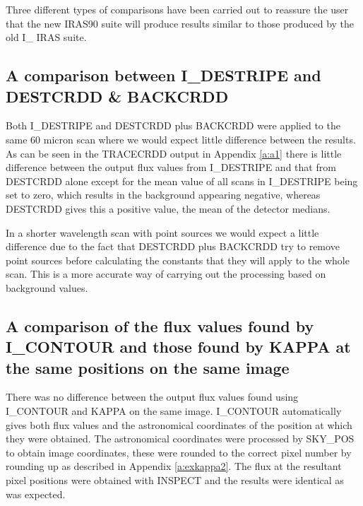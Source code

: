 Three different types of comparisons have been carried out to reassure the user
that the new IRAS90 suite will produce results similar to those produced by
the old  I\_ IRAS suite. 

\subsection{A comparison between I\_DESTRIPE and DESTCRDD \& BACKCRDD}

Both I\_DESTRIPE and DESTCRDD plus BACKCRDD were applied to the same 60 micron
scan where we would expect little difference between the results. As can be 
seen in the TRACECRDD output in Appendix \ref{a:a1} there is little difference
between the output flux values from I\_DESTRIPE and that from DESTCRDD alone
except for the mean value of all scans in I\_DESTRIPE being set to zero, which
results in the background appearing negative, whereas DESTCRDD gives this a 
positive value, the mean of the detector medians. 

In a shorter wavelength scan with point sources we would expect a little
difference due to the fact that DESTCRDD plus BACKCRDD try to remove point
sources before calculating the  constants that they will apply to the whole 
scan. This is a  more accurate  way of carrying out the processing based on
background values.
\subsection{A comparison of the flux values found by I\_CONTOUR and those found
by KAPPA at the same positions on the same image}
There was no difference between the output flux values found using I\_CONTOUR
and KAPPA on the same image. I\_CONTOUR automatically gives both flux values
and the astronomical coordinates of the position at which they were obtained.
The astronomical coordinates were processed by SKY\_POS to obtain image
coordinates, these were rounded to the correct pixel number by rounding up as
described in Appendix \ref{a:exkappa2}. The flux at the resultant pixel
positions were obtained with INSPECT and the results were identical as was
expected.
